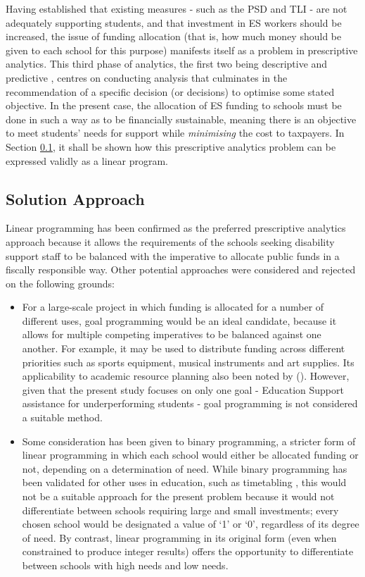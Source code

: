 \documentclass[11pt, a4paper]{article}
\begin{document}
    Having established that existing measures - such as the PSD and TLI - are not adequately supporting students, and that investment in ES workers should be increased, the issue of funding allocation (that is, how much money should be given to each school for this purpose) manifests itself as a problem in prescriptive analytics. This third phase of analytics, the first two being descriptive and predictive \parencite{analytics}, centres on conducting analysis that culminates in the recommendation of a specific decision (or decisions) to optimise some stated objective. In the present case, the allocation of ES funding to schools must be done in such a way as to be financially sustainable, meaning there is an objective to meet students' needs for support while \textit{minimising} the cost to taxpayers. In Section \ref{solution_approach}, it shall be shown how this prescriptive analytics problem can be expressed validly as a linear program.

    \subsection{Solution Approach} \label{solution_approach}

    Linear programming has been confirmed as the preferred prescriptive analytics approach because it allows the requirements of the schools seeking disability support staff to be balanced with the imperative to allocate public funds in a fiscally responsible way. Other potential approaches were considered and rejected on the following grounds:

    \begin{itemize}
        \item For a large-scale project in which funding is allocated for a number of different uses, goal programming would be an ideal candidate, because it allows for multiple competing imperatives to be balanced against one another. For example, it may be used to distribute funding across different priorities such as sports equipment, musical instruments and art supplies. Its applicability to academic resource planning also been noted by  (). However, given that the present study focuses on only one goal - Education Support assistance for underperforming students - goal programming is not considered a suitable method.
        \item Some consideration has been given to binary programming, a stricter form of linear programming in which each school would either be allocated funding or not, depending on a determination of need. While binary programming has been validated for other uses in education, such as timetabling \parencite{binary_prog}, this would not be a suitable approach for the present problem because it would not differentiate between schools requiring large and small investments; every chosen school would be designated a value of `1' or `0', regardless of its degree of need. By contrast, linear programming in its original form (even when constrained to produce integer results) offers the opportunity to differentiate between schools with high needs and low needs.
    \end{itemize}
\end{document}
